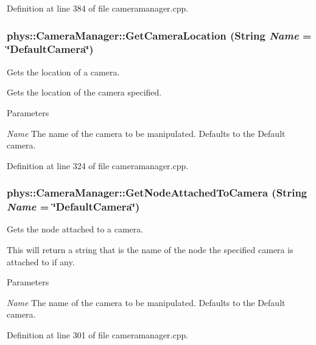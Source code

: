 Definition at line 384 of file cameramanager.cpp.

\hypertarget{classphys_1_1CameraManager_a3c94c0f970996981c3a24d0fed79d32c}{
\subsubsection[{GetCameraLocation}]{ phys::CameraManager::GetCameraLocation ({\bf String} {\em Name} = {\ttfamily \char`\"{}DefaultCamera\char`\"{}})}}
\label{d9/d91/classphys_1_1CameraManager_a3c94c0f970996981c3a24d0fed79d32c}


Gets the location of a camera. 

Gets the location of the camera specified. 
\begin{DoxyParams}{Parameters}
\item[{\em Name}]The name of the camera to be manipulated. Defaults to the Default camera. \end{DoxyParams}


Definition at line 324 of file cameramanager.cpp.

\hypertarget{classphys_1_1CameraManager_a52a62fcfbeed45a2f527f626731ddcc1}{
\subsubsection[{GetNodeAttachedToCamera}]{ phys::CameraManager::GetNodeAttachedToCamera ({\bf String} {\em Name} = {\ttfamily \char`\"{}DefaultCamera\char`\"{}})}}
\label{d9/d91/classphys_1_1CameraManager_a52a62fcfbeed45a2f527f626731ddcc1}


Gets the node attached to a camera. 

This will return a string that is the name of the node the specified camera is attached to if any. 
\begin{DoxyParams}{Parameters}
\item[{\em Name}]The name of the camera to be manipulated. Defaults to the Default camera. \end{DoxyParams}


Definition at line 301 of file cameramanager.cpp.

